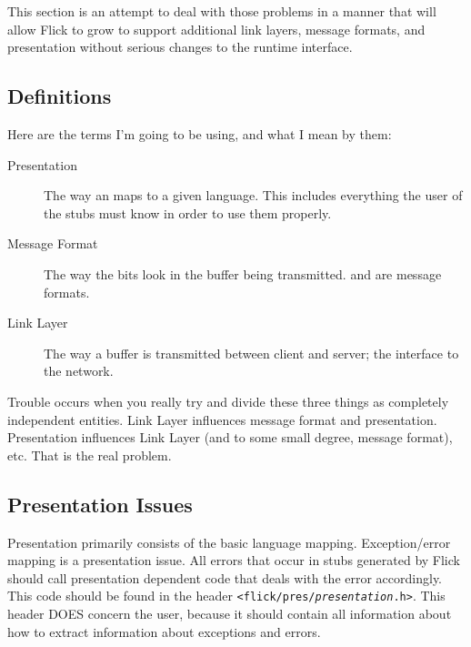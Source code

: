 This section is an attempt to deal with those problems in a manner that will
allow Flick to grow to support additional link layers, message formats, and
presentation without serious changes to the runtime interface.



\subsection{Definitions}
\label{subsec:Runtime:Definitions}

Here are the terms I'm going to be using, and what I mean by them:

\begin{description}
  \item[Presentation] The way an \IDL{} maps to a given language.  This
  includes everything the user of the stubs must know in order to use them
  properly.

  \item[Message Format] The way the bits look in the buffer being transmitted.
  \XDR{} and \CDR{} are message formats.

  \item[Link Layer] The way a buffer is transmitted between client and server;
  the interface to the network.
\end{description}

Trouble occurs when you really try and divide these three things as completely
independent entities.  Link Layer influences message format and presentation.
Presentation influences Link Layer (and to some small degree, message format),
etc.  That is the real problem.



\subsection{Presentation Issues}
\label{subsec:Runtime:Presentation Issues}

Presentation primarily consists of the basic language mapping.  Exception/error
mapping is a presentation issue.  All errors that occur in stubs generated by
Flick should call presentation dependent code that deals with the error
accordingly.  This code should be found in the header
\texttt{<flick/pres/\emph{presentation}.h>}.  This header DOES concern the
user, because it should contain all information about how to extract
information about exceptions and errors.


